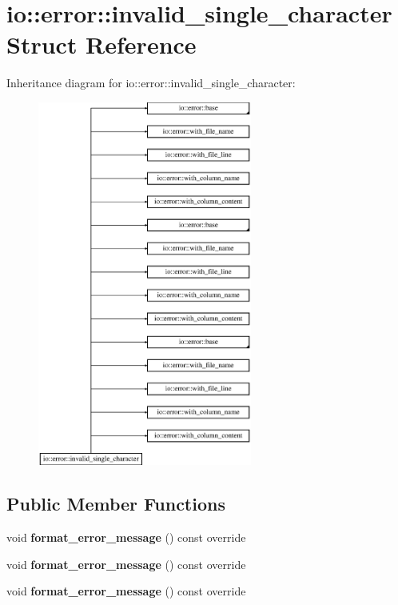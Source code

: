 \hypertarget{structio_1_1error_1_1invalid__single__character}{}\section{io\+:\+:error\+:\+:invalid\+\_\+single\+\_\+character Struct Reference}
\label{structio_1_1error_1_1invalid__single__character}
Inheritance diagram for io\+:\+:error\+:\+:invalid\+\_\+single\+\_\+character\+:\begin{figure}[H]
\begin{center}
\leavevmode
\includegraphics[height=12.000000cm]{dd/d70/structio_1_1error_1_1invalid__single__character}
\end{center}
\end{figure}
\subsection*{Public Member Functions}
\begin{DoxyCompactItemize}
\item 
\mbox{\label{structio_1_1error_1_1invalid__single__character_aae79403ba8d6d088262b3f3419dd061a}} 
void {\bfseries format\+\_\+error\+\_\+message} () const override
\item 
\mbox{\label{structio_1_1error_1_1invalid__single__character_aae79403ba8d6d088262b3f3419dd061a}} 
void {\bfseries format\+\_\+error\+\_\+message} () const override
\item 
\mbox{\label{structio_1_1error_1_1invalid__single__character_aae79403ba8d6d088262b3f3419dd061a}} 
void {\bfseries format\+\_\+error\+\_\+message} () const override
\end{DoxyCompactItemize}
